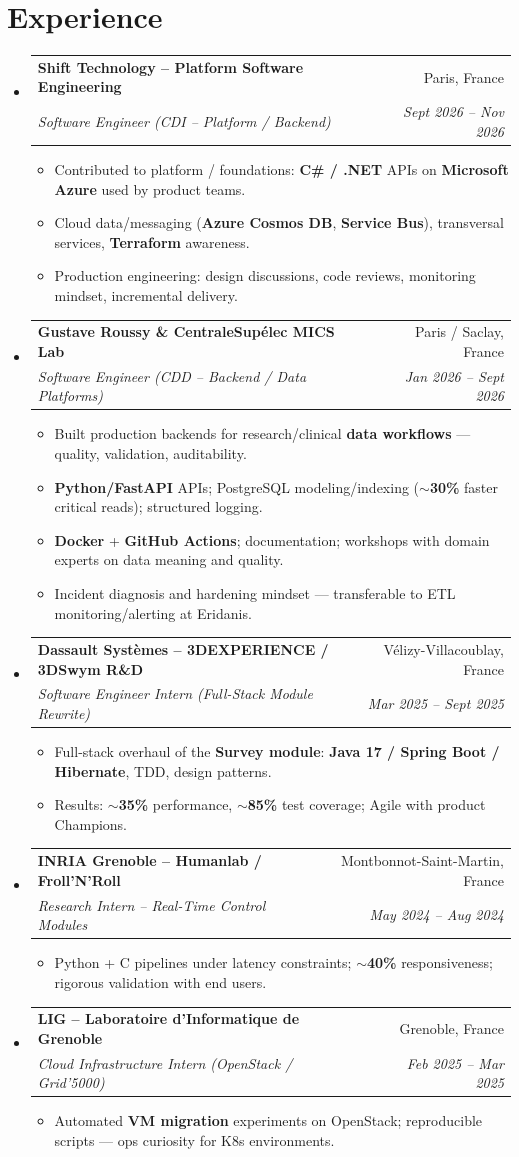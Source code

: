 \documentclass[letterpaper,10.5pt]{article}
\makeatletter
\newcommand{\resumeItem}[1]{\item\small{#1 \vspace{-1.5pt}}}
\newcommand{\resumeSubheading}[4]{\vspace{-1pt}\item\begin{tabular*}{0.97\textwidth}[t]{l@{\extracolsep{\fill}}r}\textbf{#1} & #2 \\\textit{\small#3} & \textit{\small #4} \\\end{tabular*}\vspace{-5pt}}
\newcommand{\resumeSubHeadingListStart}{\begin{itemize}[leftmargin=0.15in, label={}]}
\newcommand{\resumeSubHeadingListEnd}{\end{itemize}}
\newcommand{\resumeItemListStart}{\begin{itemize}[leftmargin=0.18in]}
\newcommand{\resumeItemListEnd}{\end{itemize}\vspace{-3pt}}
\makeatother
\begin{document}
\section{Experience}
\resumeSubHeadingListStart
  \resumeSubheading
    {Shift Technology -- Platform Software Engineering}{Paris, France}
    {Software Engineer (CDI -- Platform / Backend)}{Sept 2026 -- Nov 2026}
    \resumeItemListStart
      \resumeItem{Contributed to platform / foundations: \textbf{C\# / .NET} APIs on \textbf{Microsoft Azure} used by product teams.}
      \resumeItem{Cloud data/messaging (\textbf{Azure Cosmos DB}, \textbf{Service Bus}), transversal services, \textbf{Terraform} awareness.}
      \resumeItem{Production engineering: design discussions, code reviews, monitoring mindset, incremental delivery.}
    \resumeItemListEnd
  \resumeSubheading
    {Gustave Roussy \& CentraleSup\'elec MICS Lab}{Paris / Saclay, France}
    {Software Engineer (CDD -- Backend / Data Platforms)}{Jan 2026 -- Sept 2026}
    \resumeItemListStart
      \resumeItem{Built production backends for research/clinical \textbf{data workflows} --- quality, validation, auditability.}
      \resumeItem{\textbf{Python/FastAPI} APIs; PostgreSQL modeling/indexing (\textbf{$\sim$30\%} faster critical reads); structured logging.}
      \resumeItem{\textbf{Docker} + \textbf{GitHub Actions}; documentation; workshops with domain experts on data meaning and quality.}
      \resumeItem{Incident diagnosis and hardening mindset --- transferable to ETL monitoring/alerting at Eridanis.}
    \resumeItemListEnd
  \resumeSubheading
    {Dassault Syst\`emes -- 3DEXPERIENCE / 3DSwym R\&D}{V\'elizy-Villacoublay, France}
    {Software Engineer Intern (Full-Stack Module Rewrite)}{Mar 2025 -- Sept 2025}
    \resumeItemListStart
      \resumeItem{Full-stack overhaul of the \textbf{Survey module}: \textbf{Java 17 / Spring Boot / Hibernate}, TDD, design patterns.}
      \resumeItem{Results: \textbf{$\sim$35\%} performance, \textbf{$\sim$85\%} test coverage; Agile with product Champions.}
    \resumeItemListEnd
  \resumeSubheading
    {INRIA Grenoble -- Humanlab / Froll'N'Roll}{Montbonnot-Saint-Martin, France}
    {Research Intern -- Real-Time Control Modules}{May 2024 -- Aug 2024}
    \resumeItemListStart
      \resumeItem{Python + C pipelines under latency constraints; \textbf{$\sim$40\%} responsiveness; rigorous validation with end users.}
    \resumeItemListEnd
  \resumeSubheading
    {LIG -- Laboratoire d'Informatique de Grenoble}{Grenoble, France}
    {Cloud Infrastructure Intern (OpenStack / Grid'5000)}{Feb 2025 -- Mar 2025}
    \resumeItemListStart
      \resumeItem{Automated \textbf{VM migration} experiments on OpenStack; reproducible scripts --- ops curiosity for K8s environments.}
    \resumeItemListEnd
\resumeSubHeadingListEnd
\end{document}
